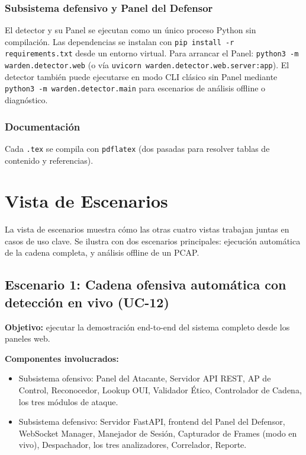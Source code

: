 \documentclass[11pt,a4paper]{article}
\begin{document}
\subsubsection{Subsistema defensivo y Panel del Defensor}
El detector y su Panel se ejecutan como un único proceso Python sin
compilación. Las dependencias se instalan con \texttt{pip install -r
requirements.txt} desde un entorno virtual. Para arrancar el Panel:
\texttt{python3 -m warden.detector.web} (o vía \texttt{uvicorn
warden.detector.web.server:app}). El detector también puede ejecutarse
en modo CLI clásico sin Panel mediante \texttt{python3
-m warden.detector.main} para escenarios de análisis offline o
diagnóstico.

\subsubsection{Documentación}
Cada \texttt{.tex} se compila con \texttt{pdflatex} (dos pasadas para
resolver tablas de contenido y referencias).

\section{Vista de Escenarios}

La vista de escenarios muestra cómo las otras cuatro vistas trabajan
juntas en casos de uso clave. Se ilustra con dos escenarios principales:
ejecución automática de la cadena completa, y análisis offline de un
PCAP.

\subsection{Escenario 1: Cadena ofensiva automática con detección en vivo (UC-12)}

\textbf{Objetivo:} ejecutar la demostración end-to-end del sistema
completo desde los paneles web.

\textbf{Componentes involucrados:}

\begin{itemize}
  \item Subsistema ofensivo: Panel del Atacante, Servidor API REST, AP
    de Control, Reconocedor, Lookup OUI, Validador Ético, Controlador
    de Cadena, los tres módulos de ataque.
  \item Subsistema defensivo: Servidor FastAPI, frontend del Panel del
    Defensor, WebSocket Manager, Manejador de Sesión, Capturador de
    Frames (modo en vivo), Despachador, los tres analizadores,
    Correlador, Reporte.
\end{itemize}
\end{document}
